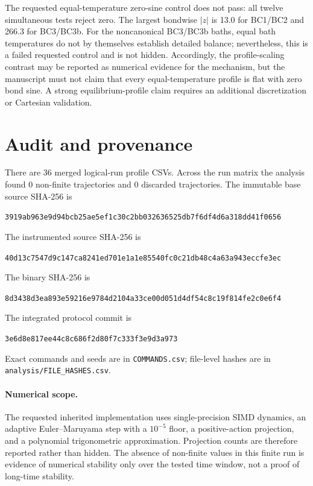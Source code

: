\documentclass[10pt]{article}
\newcommand{\code}[1]{\texttt{#1}}
\begin{document}
The requested equal-temperature zero-sine control does not pass: all twelve
simultaneous tests reject zero.  The largest bondwise $|z|$ is
13.0 for BC1/BC2 and 266.3 for BC3/BC3b.
For the noncanonical BC3/BC3b baths, equal bath temperatures do not by
themselves establish detailed balance; nevertheless, this is a failed requested
control and is not hidden.  Accordingly, the profile-scaling contrast may be
reported as numerical evidence for the mechanism, but the manuscript must not
claim that every equal-temperature profile is flat with zero bond sine.  A
strong equilibrium-profile claim requires an additional discretization or
Cartesian validation.

\section*{Audit and provenance}
There are 36 merged logical-run profile CSVs. Across the run
matrix the analysis found 0 non-finite trajectories and
0 discarded trajectories.  The immutable base source SHA-256 is
\begin{center}\scriptsize\texttt{3919ab963e9d94bcb25ae5ef1c30c2bb032636525db7f6df4d6a318dd41f0656}\end{center}
The instrumented source SHA-256 is
\begin{center}\scriptsize\texttt{40d13c7547d9c147ca8241ed701e1a1e85540fc0c21db48c4a63a943eccfe3ec}\end{center}
The binary SHA-256 is
\begin{center}\scriptsize\texttt{8d3438d3ea893e59216e9784d2104a33ce00d051d4df54c8c19f814fe2c0e6f4}\end{center}
The integrated protocol commit is
\begin{center}\scriptsize\texttt{3e6d8e817ee44c8c686f2d80f7c333f3e9d3a973}\end{center}
Exact commands and seeds are in \code{COMMANDS.csv}; file-level hashes are in
\code{analysis/FILE\_HASHES.csv}.

\paragraph{Numerical scope.}
The requested inherited implementation uses single-precision SIMD dynamics,
an adaptive Euler--Maruyama step with a $10^{-5}$ floor, a positive-action
projection, and a polynomial trigonometric approximation. Projection counts
are therefore reported rather than hidden. The absence of non-finite values in
this finite run is evidence of numerical stability only over the tested time
window, not a proof of long-time stability.
\end{document}
